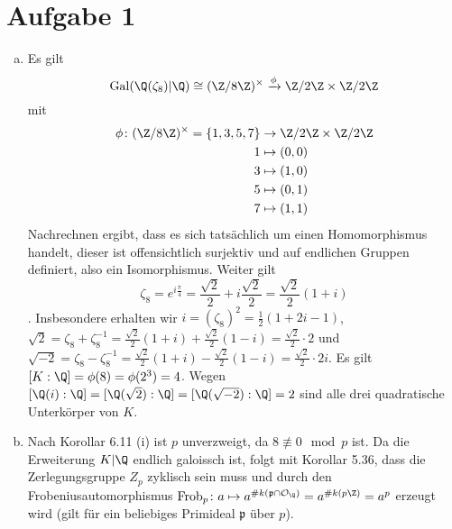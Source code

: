 \documentclass{article}
\begin{document}
\pagestyle{fancy}
\thispagestyle{firstpage}
\section*{Aufgabe 1}
\begin{enumerate}[(a)]
    \item Es gilt 
    \[
        \operatorname{Gal}(\Q(\zeta_8)|\Q) \cong (\Z/8\Z)^\times \xrightarrow{\phi} \Z/2\Z \times \Z/2\Z
    \]
    mit
    \begin{align*}
        \phi \colon (\Z/8\Z)^\times = \{1,3,5,7\} &\to \Z/2\Z \times \Z/2\Z\\
        1 &\mapsto (0,0)\\
        3 &\mapsto (1,0)\\
        5 &\mapsto (0,1)\\
        7 &\mapsto (1,1)
    \end{align*}
    Nachrechnen ergibt, dass es sich tatsächlich um einen Homomorphismus handelt, dieser ist offensichtlich surjektiv und auf endlichen Gruppen definiert, also ein Isomorphismus.
    Weiter gilt $$\zeta_8 = e^{i \frac{\pi}{4}} = \frac{\sqrt{2}}{2} + i \frac{\sqrt{2}}{2} = \frac{\sqrt{2}}{2} (1+i)$$.
    Insbesondere erhalten wir $i = (\zeta_8)^2 = \frac{1}{2} (1 + 2i - 1)$, 
    $\sqrt{2} = \zeta_8 + \zeta_8^{-1} = \frac{\sqrt{2}}{2}(1+i) + \frac{\sqrt{2}}{2}(1 - i) = \frac{\sqrt{2}}{2} \cdot 2$
    und $\sqrt{-2} = \zeta_8 - \zeta_8^{-1} = \frac{\sqrt{2}}{2}(1+i) - \frac{\sqrt{2}}{2}(1 - i) = \frac{\sqrt{2}}{2} \cdot 2i$.
    Es gilt $[K : \Q] = \phi(8) = \phi(2^3) = 4$. Wegen $[\Q(i):\Q] = [\Q(\sqrt{2}):\Q] = [\Q(\sqrt{-2}):\Q] = 2$ sind alle drei quadratische Unterkörper von $K$.
    \item Nach Korollar 6.11 (i) ist $p$ unverzweigt, da $8 \not \equiv 0 \mod p$ ist. Da die Erweiterung $K|\Q$ endlich galoissch ist, folgt mit Korollar 5.36, dass die Zerlegungsgruppe $Z_p$ zyklisch sein muss und durch den Frobeniusautomorphismus $\operatorname{Frob}_p\colon a \mapsto a^{\#k(\mathfrak{p} \cap \mathcal{O}_\Q)} = a^{\#k(p\Z)} = a^p$ erzeugt wird (gilt für ein beliebiges Primideal $\mathfrak{p}$ über $p$).
    \begin{itemize}

\end{itemize}
\end{enumerate}
\end{document}

